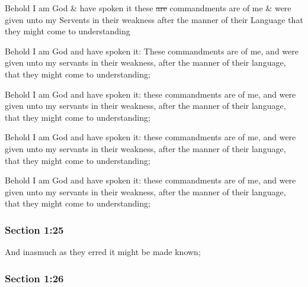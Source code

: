 		\begin{framed}
		\scriptsize
			\begin{compactdesc}
				\item[JSP] Behold I am God \& have spoken it these \sout{are} commandments are of me \& were given unto my Servents in their weakness after the manner of their Language that they might come to understanding
				\item[EMS] Behold I am God and have spoken it: These commandments are of me, and were given unto my servants in their weakness, after the manner of their language, that they might come to understanding;
				\item[BC] Behold I am God and have spoken it: these commandments are of me, and were given unto my servants in their weakness, after the manner of their language, that they might come to understanding;
				\item[DC 1835] Behold I am God and have spoken it: these commandments are of me, and were given unto my servants in their weakness, after the manner of their language, that they might come to understanding;
				\item[DC 1844] Behold I am God and have spoken it: these commandments are of me, and were given unto my servants in their weakness, after the manner of their language, that they might come to understanding;
			\end{compactdesc}
		\end{framed}

	\subsubsection{Section 1:25} %
		\label{DC1-25}

		And inasmuch as they erred it might be made known;


	\subsubsection{Section 1:26} %
		\label{DC1-26}

